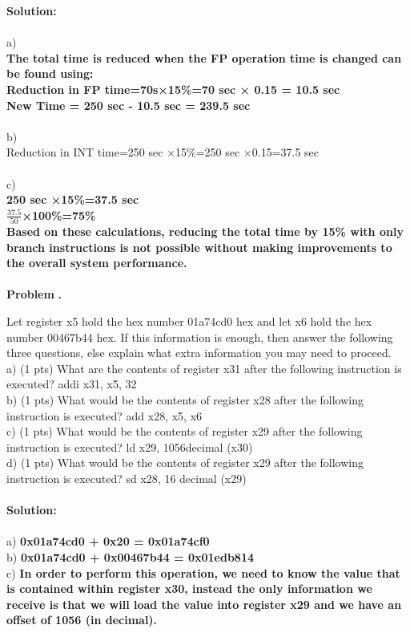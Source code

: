 \documentclass[11pt]{article}
\newcounter{problem}
\newcounter{solution}
\newcommand\Problem{%
	\stepcounter{problem}%
	\textbf{\theproblem.}~%
	\setcounter{solution}{0}%
}
\newcommand\TheSolution{%
	\textbf{Solution:}\\%
}
\begin{document}
	\TheSolution
	\\
	a)\\
	\textbf{The total time is reduced when the FP operation time is changed can be found using:\\
	Reduction in FP time=70s×15\%=70 sec × 0.15 = 10.5 sec\\
	New Time =  250 sec - 10.5 sec = 239.5 sec}
	\\
	\\
	b)\\
	Reduction in INT time=250 sec ×15\%=250 sec ×0.15=37.5 sec\\
	\\
	c) \\ \textbf{
	250 sec ×15\%=37.5 sec\\
	$\frac{37.5}{50}$×100\%=75\%\\
	Based on these calculations, reducing the total time by 15\% with only branch instructions is not possible without making improvements to the overall system performance.}\\
	\\
	\textbf{Problem} \Problem
	Let register x5 hold the hex number 01a74cd0 hex and let x6 hold the hex number 00467b44 hex. If this information
	is enough, then answer the following three questions, else explain what extra information you may need to
	proceed.\\
	a) (1 pts) What are the contents of register x31 after the following instruction is executed?
	addi x31, x5, 32\\
	b) (1 pts) What would be the contents of register x28 after the following instruction is executed?
	add x28, x5, x6\\
	c) (1 pts) What would be the contents of register x29 after the following instruction is executed?
	ld x29, 1056decimal (x30)\\
	d) (1 pts) What would be the contents of register x29 after the following instruction is executed?
	sd x28, 16 decimal (x29)\\
	\\
	\TheSolution \\
	a) \textbf{0x01a74cd0 + 0x20 = 0x01a74cf0}\\
	b)\textbf{ 0x01a74cd0 + 0x00467b44 = 0x01edb814}\\
	c) \textbf{In order to perform this operation, we need to know the value that is contained within register x30, instead the only information we receive is that we will load the value into register x29 and we have an offset of 1056 (in decimal).}\\
\end{document}
